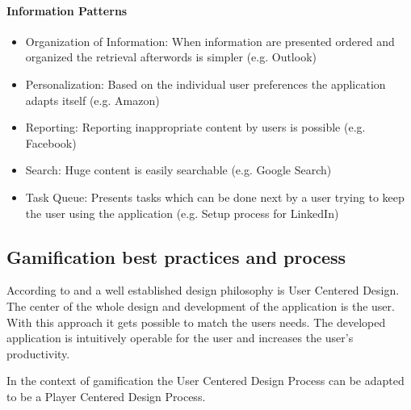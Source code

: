 \paragraph*{Information Patterns}
\begin{itemize}
	\item Organization of Information: When information are presented ordered and organized the retrieval afterwords is simpler (e.g. Outlook) \cite[p. 6, 85, 86]{lewisIrresistibleAppsMotivational2014}
	\item Personalization: Based on the individual user preferences the application adapts itself (e.g. Amazon) \cite[p. 6, 87]{lewisIrresistibleAppsMotivational2014}
	\item Reporting: Reporting inappropriate content by users is possible (e.g. Facebook) \cite[p. 6, 90]{lewisIrresistibleAppsMotivational2014}
	\item Search: Huge content is easily searchable (e.g. Google Search) \cite[p. 6, 90, 91]{lewisIrresistibleAppsMotivational2014}
	\item Task Queue: Presents tasks which can be done next by a user trying to keep the user using the application (e.g. Setup process for LinkedIn) \cite[p. 6, 93]{lewisIrresistibleAppsMotivational2014}
\end{itemize}

\newpage

\subsection{Gamification best practices and process}
\label{sec:theoryBd}

According to \cite[p. 5, 6]{lowdermilkUsercenteredDesignDevelopers2013} and \cite[p. 27, 28]{inproceedings} a well established design philosophy is User Centered Design. The center of the whole design and development of the application is the user. With this approach it gets possible to match the users needs. The developed application is intuitively operable for the user and increases the user's productivity.

In the context of gamification the User Centered Design Process can be adapted to be a Player Centered Design Process.  

